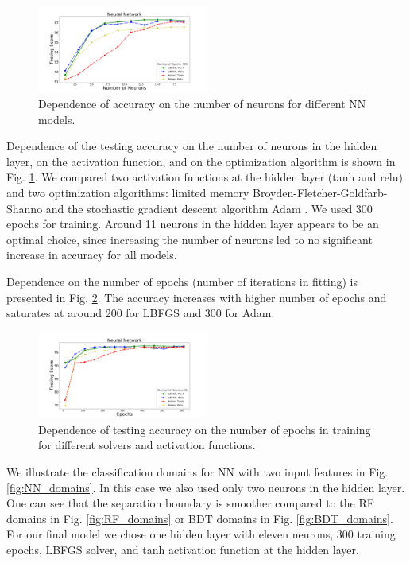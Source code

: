 \documentclass[referee]{aa} %
\begin{document}
\begin{figure}[h]
\centering
\includegraphics[width=0.5\textwidth]{plots/nn_train_neurons_assocnewfeat.pdf}
\caption{Dependence of accuracy on the number of neurons for different NN models.}
\label{fig:NN_neurons}
\end{figure}

Dependence of the testing accuracy on the number of neurons in the hidden layer, on the activation function, 
and on the optimization algorithm is shown in Fig. \ref{fig:NN_neurons}. 
We compared two activation functions at the hidden layer (tanh and relu) and two optimization algorithms: 
limited memory Broyden-Fletcher-Goldfarb-Shanno \citep[LBFGS;][]{lbfgs} 
and the stochastic gradient descent algorithm Adam \citep{2014arXiv1412.6980K}.
We used 300 epochs for training.
Around 11 neurons in the hidden layer appears to be an optimal choice, since increasing the number of neurons led to no significant increase in accuracy for all models. 

Dependence on the number of epochs (number of iterations in fitting) is presented in Fig. \ref{fig:NN_epochs}. 
The accuracy increases with higher number of epochs and saturates at around 200 for LBFGS and 300 for Adam. 




\begin{figure}[h]
\centering
\includegraphics[width=0.5\textwidth]{plots/nn_train_epochs_assocnewfeat.pdf}
\caption{
Dependence of testing accuracy on the number of epochs in training for different solvers and activation functions.
}
\label{fig:NN_epochs}
\end{figure}
 
We illustrate the classification domains for NN with two input features in Fig. \ref{fig:NN_domains}. 
In this case we also used only two neurons in the hidden layer.
One can see that the separation boundary is smoother compared to the RF domains in Fig. \ref{fig:RF_domains} or BDT domains in Fig. \ref{fig:BDT_domains}.
For our final model we chose one hidden layer with eleven neurons, 300 training epochs, LBFGS solver, and tanh activation function at the hidden layer.
\end{document}
